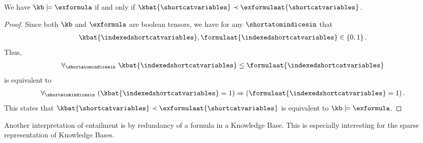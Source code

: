 \begin{theorem}
    \label{the:orderingEntailmentCriterion}
    We have $\kb\models\exformula$ if and only if $\kbat{\shortcatvariables}\prec\exformulaat{\shortcatvariables}$.
\end{theorem}
\begin{proof}
    Since both $\kb$ and $\exformula$ are boolean tensors, we have for any $\shortatomindicesin$ that
    \begin{align*}
        \kbat{\indexedshortcatvariables},\formulaat{\indexedshortcatvariables}\in\ozset \, .
    \end{align*}
    Thus,
    \begin{align*}
        \uniquantwrtof{\shortatomindicesin}{\kbat{\indexedshortcatvariables}\leq\formulaat{\indexedshortcatvariables}}
    \end{align*}
    is equivalent to
    \begin{align*}
        \uniquantwrtof{\shortatomindicesin}{\imppremhead{\kbat{\indexedshortcatvariables}=1}{\formulaat{\indexedshortcatvariables}=1}} \, .
    \end{align*}
    This states that $\kbat{\shortcatvariables}\prec\exformulaat{\shortcatvariables}$ is equivalent to $\kb\models\exformula$.
\end{proof}




Another interpretation of entailment is by redundancy of a formula in a Knowledge Base.
This is especially interesting for the sparse representation of Knowledge Bases.

